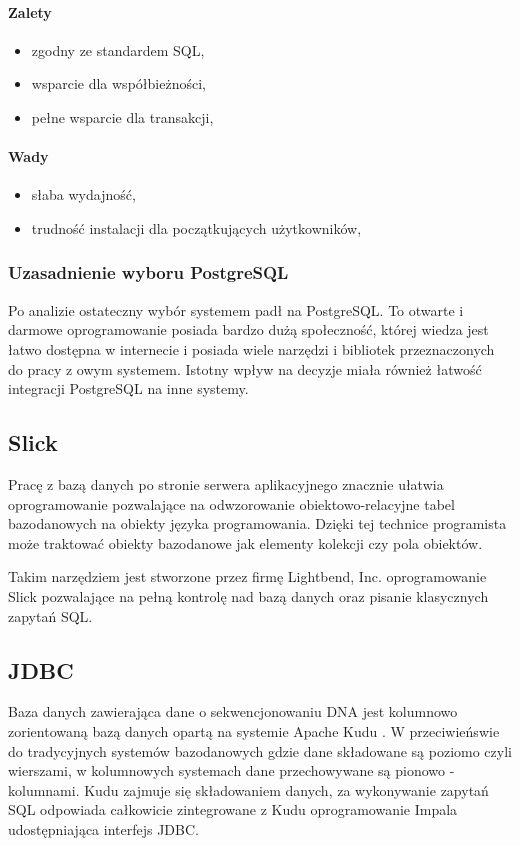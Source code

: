 \documentclass[a4paper,12pt,twoside]{article}
\begin{document}
\paragraph{Zalety}
\begin{itemize}
\item{zgodny ze standardem SQL},
\item{wsparcie dla współbieżności},
\item{pełne wsparcie dla transakcji},
\end{itemize}
\paragraph{Wady}
\begin{itemize}
\item{słaba wydajność},
\item{trudność instalacji dla początkujących użytkowników},
\end{itemize}

\subsubsection{Uzasadnienie wyboru PostgreSQL}
Po analizie ostateczny wybór systemem padł na PostgreSQL.
To otwarte i darmowe oprogramowanie posiada bardzo dużą społeczność, której wiedza jest łatwo dostępna w internecie 
i posiada wiele narzędzi i bibliotek przeznaczonych do pracy z owym systemem. 
Istotny wpływ na decyzje miała również łatwość integracji PostgreSQL na inne systemy.  

\subsection{Slick}  
Pracę z bazą danych po stronie serwera aplikacyjnego 
znacznie ułatwia oprogramowanie pozwalające na odwzorowanie obiektowo-relacyjne tabel bazodanowych na obiekty języka programowania.
Dzięki tej technice programista może traktować obiekty bazodanowe jak elementy kolekcji czy pola obiektów.

Takim narzędziem jest stworzone przez firmę Lightbend, Inc. 
oprogramowanie Slick\cite{slick} pozwalające na pełną kontrolę nad bazą danych oraz pisanie klasycznych zapytań SQL.

\subsection{JDBC}  
Baza danych zawierająca dane o sekwencjonowaniu DNA jest kolumnowo zorientowaną bazą danych opartą na systemie Apache Kudu \cite{kudu}. W przeciwieńswie do tradycyjnych systemów bazodanowych gdzie dane składowane są poziomo czyli wierszami, w kolumnowych systemach dane przechowywane są pionowo - kolumnami.
Kudu zajmuje się składowaniem danych, za wykonywanie zapytań SQL 
odpowiada całkowicie zintegrowane z Kudu oprogramowanie Impala \cite{impala} \cite{impalaArt} udostępniająca interfejs JDBC.
\end{document}
